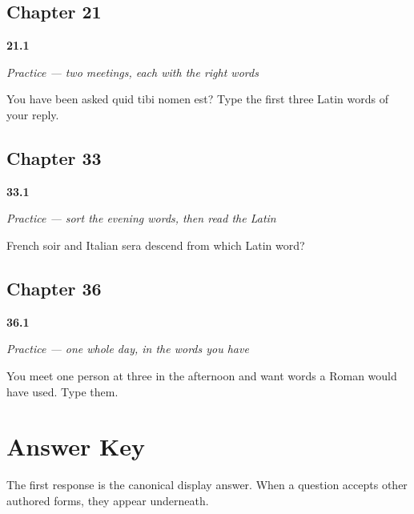 \section*{Chapter 21}

\noindent\begin{minipage}[t]{\linewidth}
\raggedright
\hypertarget{review-LA-C21-practice-name-reply}{\textbf{21.1}} \emph{Practice — two meetings, each with the right words}\par
\small You have been asked quid tibi nomen est? Type the first three Latin words of your reply.
\end{minipage}\par\medskip

\section*{Chapter 33}

\noindent\begin{minipage}[t]{\linewidth}
\raggedright
\hypertarget{review-LA-C33-practice-soir-family}{\textbf{33.1}} \emph{Practice — sort the evening words, then read the Latin}\par
\small French soir and Italian sera descend from which Latin word?
\end{minipage}\par\medskip

\section*{Chapter 36}

\noindent\begin{minipage}[t]{\linewidth}
\raggedright
\hypertarget{review-LA-C36-practice-afternoon-line}{\textbf{36.1}} \emph{Practice — one whole day, in the words you have}\par
\small You meet one person at three in the afternoon and want words a Roman would have used. Type them.
\end{minipage}\par\medskip

\chapter*{Answer Key}

The first response is the canonical display answer. When a question accepts other authored forms, they appear underneath.

